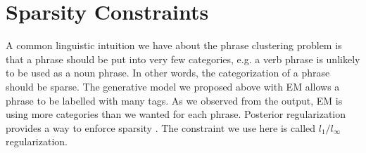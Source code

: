\section{Sparsity Constraints}
A common linguistic intuition we have about the phrase 
clustering problem is that a phrase should be put into very
few categories, e.g. a verb phrase is unlikely to be used as 
a noun phrase. In other words, the categorization of
a phrase should be sparse.
The generative model we proposed above with EM
allows a phrase to be labelled with many tags. As we observed
from the output, EM is using more categories than we wanted for
each phrase.
Posterior regularization
provides a way to enforce sparsity \citep{ganchev:penn:2009}.
The constraint we use here is called $l_1/ l_\infty$
regularization.